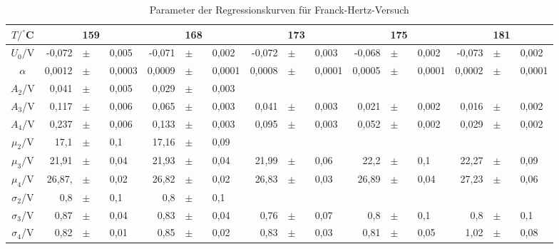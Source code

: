  \begin{table}[h]
    \centering
    \caption{Parameter der Regressionskurven für Franck-Hertz-Versuch}
    \label{tab:fh_parameter_2}
    \begin{tabular}{c | r p{0.05cm} l r p{0.05cm} l r p{0.05cm} l r p{0.05cm} l r p{0.05cm} l}
      \toprule
       $T/^\circ$C & & 159 & & & 168 & & & 173 & & & 175 & & & 181& \\  
      \midrule
      $U_0/$V &              -0,072         &$\pm$ & 0,005      &   -0,071        &$\pm$ & 0,002     & -0,072  & $\pm$ &  0,003  &  -0,068  & $\pm$  & 0,002 & -0,073 & $\pm$ & 0,002\\    
      $\alpha$& 0,0012         &$\pm$ & 0,0003    &  0,0009        &$\pm$ & 0,0001    & 0,0008  & $\pm$ & 0,0001   &   0,0005 & $\pm$  & 0,0001 & 0,0002 & $\pm$ & 0,0001\\
      $A_2$/V &              0,041         &$\pm$ & 0,005     &   0,029          &$\pm$ & 0,003    &   &  &   &    &   &  & & &\\ 
      $A_3$/V &              0,117         &$\pm$ & 0,006     &   0,065         &$\pm$ & 0,003    &  0,041 & $\pm$ & 0,003   &  0,021  & $\pm$  & 0,002 & 0,016 & $\pm$ & 0,002\\ 
      $A_4$/V &              0,237          &$\pm$ & 0,006     &   0,133          &$\pm$ & 0,003    & 0,095  & $\pm$ & 0,003   &  0,052  & $\pm$  & 0,002 & 0,029 & $\pm$ & 0,002\\ 
      $\mu_2/$V &            17,1          &$\pm$ & 0,1     &   17,16            &$\pm$ & 0,09     &   &  &    &   &   & & & &\\ 
      $\mu_3/$V &            21,91          &$\pm$ & 0,04     &   21,93          &$\pm$ & 0,04    &  21,99 & $\pm$ & 0,06   &  22,2  & $\pm$  & 0,1 & 22,27 & $\pm$ & 0,09\\ 
      $\mu_4/$V &            26,87,           &$\pm$ & 0,02      &   26,82           &$\pm$ & 0,02     & 26,83  & $\pm$ & 0,03   &   26,89 & $\pm$  & 0,04 & 27,23 & $\pm$ & 0,06\\ 
      $\sigma_2$/V &         0,8          &$\pm$ & 0,1      &   0,8          &$\pm$ & 0,1     &   &  &   &    &  &  &  & & \\ 
      $\sigma_3$/V &         0,87         &$\pm$ & 0,04     &   0,83          &$\pm$ & 0,04    & 0,76  & $\pm$ &  0,07  &  0,8  & $\pm$  & 0,1 & 0,8 & $\pm$ & 0,1\\ 
      $\sigma_4$/V &         0,82         &$\pm$ & 0,01      &   0,85         &$\pm$ & 0,02    & 0,83  & $\pm$ & 0,03   &   0,81 & $\pm$  & 0,05 & 1,02 & $\pm$ & 0,08\\ 
      \bottomrule
    \end{tabular}
  \end{table}

